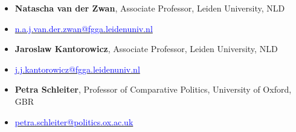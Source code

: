 \begin{publications}

\begin{itemize}
\item[]{\small {\bfseries Natascha van der Zwan}, Associate Professor, Leiden University, NLD}
\item[]{\vspace{-1mm}\textcolor{oxfordblue}{\faEnvelope} \hspace{0.1mm} {\small \href{mailto:n.a.j.van.der.zwan@fgga.leidenuniv.nl}{\textcolor{blue}{n.a.j.van.der.zwan@fgga.leidenuniv.nl}}}} \vspace{1.5mm}
\item[]{\small {\bfseries Jaroslaw Kantorowicz}, Associate Professor, Leiden University, NLD}
\item[]{\vspace{-1mm}\textcolor{oxfordblue}{\faEnvelope} \hspace{0.1mm} {\small \href{mailto:j.j.kantorowicz@fgga.leidenuniv.nl}{\textcolor{blue}{j.j.kantorowicz@fgga.leidenuniv.nl}}}} \vspace{1.5mm}
\item[]{\small {\bfseries Petra Schleiter}, Professor of Comparative Politics, University of Oxford, GBR}
\item[]{\vspace{-1mm}\textcolor{oxfordblue}{\faEnvelope} \hspace{0.1mm} {\small \href{mailto:petra.schleiter@politics.ox.ac.uk}{\textcolor{blue}{petra.schleiter@politics.ox.ac.uk}}}} \vspace{1.5mm}
\end{itemize}

\end{publications}
